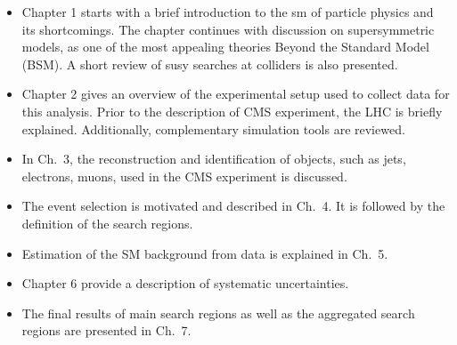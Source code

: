 \begin{itemize}
  \item Chapter 1 starts with a brief introduction to the \acrshort{sm} of particle physics and its shortcomings. The chapter continues with discussion on supersymmetric models, as one of the most appealing theories Beyond the Standard Model (BSM). A short review of \acrshort{susy} searches at colliders is also presented.
  \item Chapter 2 gives an overview of the experimental setup used to collect data for this analysis. Prior to the description of CMS experiment, the LHC is briefly explained. Additionally, complementary simulation tools are reviewed.
  \item In Ch.~3, the reconstruction and identification of objects, such as jets,  electrons, muons, used in the CMS experiment is discussed. 
  \item The event selection is motivated and described in Ch.~4. It is followed by the definition of the search regions.
  \item Estimation of the SM background from data is explained in Ch.~5.
  \item Chapter 6 provide a description of systematic uncertainties.
  \item The final results of main search regions as well as the aggregated search regions are presented in Ch.~7. 
\end{itemize}


